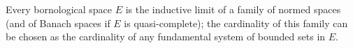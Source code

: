 Every bornological space $E$ is the inductive limit of a family of normed spaces (and of Banach spaces if $E$ is quasi-complete); the cardinality of this family can be chosen as the cardinality of any fundamental system of bounded sets in $E$.
